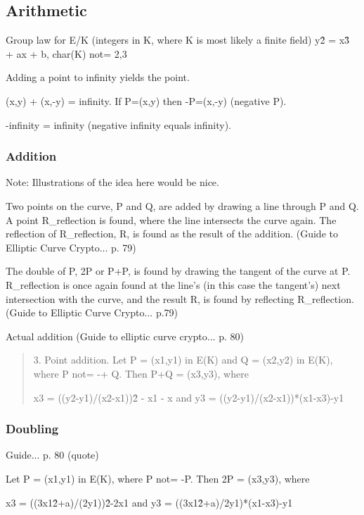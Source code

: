 \subsection{Arithmetic}

Group law for E/K (integers in K, where K is most likely a finite field)
y\^2 = x\^3 + ax + b, char(K) not= 2,3

Adding a point to infinity yields the point.

(x,y) + (x,-y) = infinity. If P=(x,y) then -P=(x,-y) (negative P).

-infinity = infinity (negative infinity equals infinity).

\subsubsection{Addition}

Note: Illustrations of the idea here would be nice.

Two points on the curve, P and Q, are added by drawing a line through P and Q. A point R\_reflection
is found, where the line intersects the curve again. The reflection of R\_reflection, R, is found as
the result of the addition. (Guide to Elliptic Curve Crypto... p. 79)

The double of P, 2P or P+P, is found by drawing the tangent of the curve at P. R\_reflection is once again found at the line's (in this case the tangent's) next intersection with the curve, and the result R, is found by reflecting R\_reflection. (Guide to Elliptic Curve Crypto... p.79)

Actual addition (Guide to elliptic curve crypto... p. 80)
\begin{quote}
	3. Point addition. Let P = (x1,y1) in E(K) and Q = (x2,y2) in E(K), where P not= -+ Q.
	Then P+Q = (x3,y3), where
	
	x3 = ((y2-y1)/(x2-x1))\^2 - x1 - x    and    y3 = ((y2-y1)/(x2-x1))*(x1-x3)-y1
\end{quote}

\subsubsection{Doubling}
Guide... p. 80 (quote)

Let P = (x1,y1) in E(K), where P not= -P. Then 2P = (x3,y3), where

x3 = ((3x1\^2+a)/(2y1))\^2-2x1    and    y3 = ((3x1\^2+a)/2y1)*(x1-x3)-y1